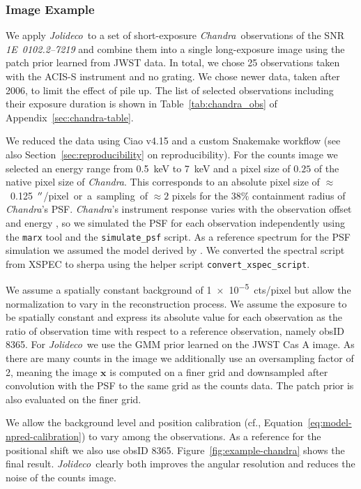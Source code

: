\documentclass[twocolumn]{aastex631}
\newcommand{\chandra}{\textit{Chandra}~}
\newcommand{\chandranospace}{\textit{Chandra}}
\newcommand{\jolideco}{\textit{Jolideco}~}
\begin{document}
    \subsubsection{Image Example}
    We apply \jolideco to a set of short-exposure \chandra observations of the SNR \textit{1E~0102.2–7219} and combine them into a single long-exposure image using the patch prior learned from JWST data. In total, we chose 25 observations taken with  the ACIS-S instrument and no grating. We chose newer data, taken after 2006, to limit the effect of pile up.
    The list of selected observations including their exposure duration is shown in Table~\ref{tab:chandra_obs} of Appendix~\ref{sec:chandra-table}.

    We reduced the data using Ciao v4.15 and a custom Snakemake workflow (see also Section~\ref{sec:reproducibility} on reproducibility). For the counts image we selected an energy range from \qty[mode = text]{0.5}{keV} to  \qty[mode = text]{7}{keV} and a pixel size of $0.25$ of the native pixel size of \chandranospace. This corresponds to an absolute  pixel size of $\approx$~\qty[mode = text]{0.125}{$\mbox{$^{\prime\prime}$}$/pixel} or a sampling of $\approx2$ pixels for the $38\%$ containment radius of \chandranospace's PSF. \chandranospace's instrument response varies with the observation offset and energy \citep{ChandraPOG2022}, so we simulated the PSF for each observation independently using the \texttt{marx} tool \citep{Davis2012} and the \texttt{simulate\_psf} script. As a reference spectrum for the PSF simulation we assumed the model derived by \cite{Plucinsky2017}. We converted the spectral script from XSPEC to sherpa using the helper script \texttt{convert\_xspec\_script}.

    We assume a spatially constant background of \qty[mode = text]{1e-5}{cts/pixel} but allow the normalization to vary in the reconstruction process. We assume the exposure to be spatially constant and express its absolute value for each observation as the ratio of observation time with respect to a reference observation, namely obsID 8365. For \jolideco we use the GMM prior learned on the JWST Cas A image. As there are many counts in the image we additionally use an oversampling factor of 2, meaning the image $\mathbf{x}$ is computed on a finer grid and downsampled after convolution with the PSF to the same grid as the counts data. The patch prior is also evaluated on the finer grid.
    
    We allow the background level and position calibration (cf., Equation~\ref{eq:model-npred-calibration}) to vary among the observations. As a reference for the positional shift we also use obsID 8365. Figure~\ref{fig:example-chandra} shows the final result. \jolideco clearly both improves the angular resolution and reduces the noise of the counts image. 
    
\end{document}
